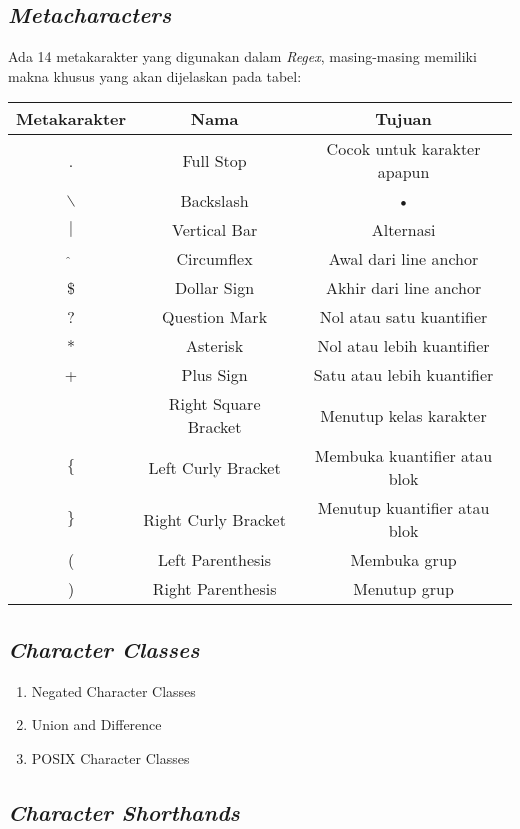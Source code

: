 \subsection{\textit{Metacharacters}}
Ada 14 metakarakter yang digunakan dalam \textit{Regex}, masing-masing memiliki makna khusus yang akan dijelaskan pada tabel: \\

\begin{tabular}{|c|c|c|}
\hline 
Metakarakter & Nama & Tujuan \\ 
\hline 
. & Full Stop & Cocok untuk karakter apapun \\ 
\hline 
$\backslash$ & Backslash & • \\ 
\hline 
$\vert$ & Vertical Bar & Alternasi  \\ 
\hline 
$\hat{}$ & Circumflex & Awal dari line anchor \\ 
\hline 
\$ & Dollar Sign & Akhir dari line anchor \\ 
\hline 
? & Question Mark & Nol atau satu kuantifier \\ 
\hline 
* & Asterisk & Nol atau lebih kuantifier \\ 
\hline 
+ & Plus Sign & Satu atau lebih kuantifier \\ 
\hline 
[ & Left Square Bracket & Membuka kelas karakter\\ 
\hline 
] & Right Square Bracket & Menutup kelas karakter \\ 
\hline 
$\lbrace$ & Left Curly Bracket & Membuka kuantifier atau blok \\ 
\hline 
$\rbrace$ & Right Curly Bracket & Menutup kuantifier atau blok \\ 
\hline 
( & Left Parenthesis & Membuka grup \\ 
\hline 
) & Right Parenthesis & Menutup grup \\ 
\hline 
\end{tabular} 

\subsection{\textit{Character Classes}}
\begin{enumerate}
	\item Negated Character Classes
	
	\item Union and Difference
	
	\item POSIX Character Classes
	
\end{enumerate}

\subsection{\textit{Character Shorthands}}